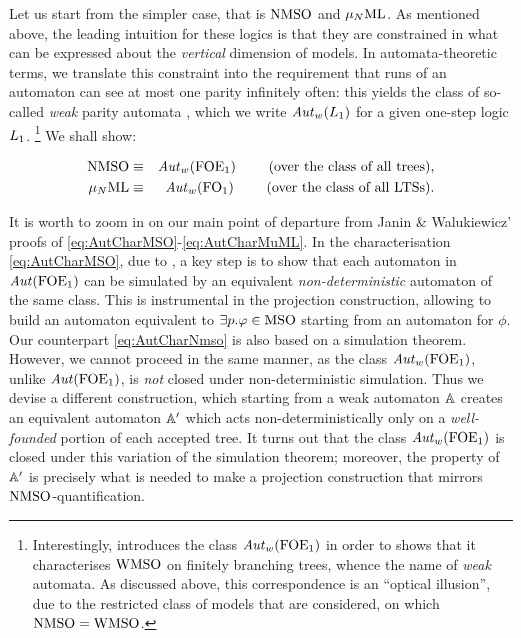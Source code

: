 Let us start from the simpler case, that is $\mathrm{NMSO}$ and $\mu_{N}\mathrm{ML}$.
As mentioned above, the leading intuition for these logics is that they are
constrained in what can be expressed about the \emph{vertical} dimension of 
models. 
In automata-theoretic terms, we translate this constraint into the requirement 
that runs of an automaton can see at most one parity infinitely often: this 
yields the class of so-called \emph{weak} parity 
automata \cite{MullerSaoudiSchupp92}, which we write $\mathit{Aut}_{w}(L_{1})$ for a
given one-step logic $L_{1}$. \footnote{%
    Interestingly, \cite{MullerSaoudiSchupp92} introduces the class
    $\mathit{Aut}_{w}(\mathrm{FOE}_1)$ in order to shows that it characterises $\mathrm{WMSO}$ on 
    finitely branching trees, whence the name of \emph{weak} automata. 
    As discussed above, this correspondence is an ``optical illusion'', due to
    the restricted class of models that are considered, on which $\mathrm{NMSO} = 
    \mathrm{WMSO}$.
    } 
We shall show:
\begin{theorem}
\begin{eqnarray}
\nmso & \equiv & \AutW(\ofoe)
  \qquad \text{ (over the class of all trees)}, \label{eq:AutCharNmso}
\\ \mudML & \equiv & \AutW(\ofo)\label{eq:AutCharMudML}
  \qquad \text{ (over the class of all LTSs)}.
\end{eqnarray}
\end{theorem}
It is worth to zoom in on our main point of departure from Janin \& Walukiewicz' 
proofs of \eqref{eq:AutCharMSO}-\eqref{eq:AutCharMuML}. 
In the characterisation \eqref{eq:AutCharMSO}, due to \cite{Walukiewicz96}, 
a key step is to show that each automaton in $\mathit{Aut}(\mathrm{FOE}_1)$ can be simulated by
an equivalent \emph{non-deterministic} automaton of the same class. 
This is instrumental in the projection construction, allowing to build an
automaton equivalent to $\exists p.\varphi \in \mathrm{MSO}$ starting from an automaton 
for $\phi$. 
Our counterpart \eqref{eq:AutCharNmso} is also based on a simulation theorem. 
However, we cannot proceed in the same manner, as the class $\mathit{Aut}_{w}(\mathrm{FOE}_1)$,
unlike $\mathit{Aut}(\mathrm{FOE}_1)$, is \emph{not} closed under non-deterministic simulation.
Thus we devise a different construction, which starting from a weak automaton 
$\mathbb{A}$ creates an equivalent automaton $\mathbb{A}'$ which acts non-deterministically 
only on a \emph{well-founded} portion of each accepted tree.
It turns out that the class $\mathit{Aut}_{w}(\mathrm{FOE}_1)$ is closed under this variation of 
the simulation theorem; moreover, the property of $\mathbb{A}'$ is precisely what is
needed to make a projection construction that mirrors $\mathrm{NMSO}$-quantification.
\medskip

